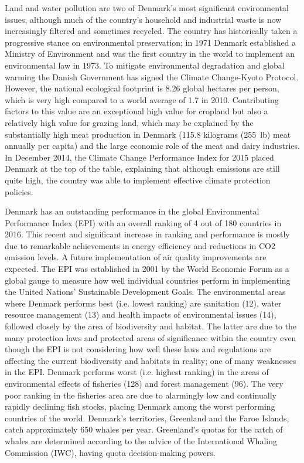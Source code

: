 Land and water pollution are two of Denmark's most significant
environmental issues, although much of the country's household and
industrial waste is now increasingly filtered and sometimes recycled.
The country has historically taken a progressive stance on environmental
preservation; in 1971 Denmark established a Ministry of Environment and
was the first country in the world to implement an environmental law in
1973. To mitigate environmental degradation and global warming the
Danish Government has signed the Climate Change-Kyoto Protocol. However,
the national ecological footprint is 8.26 global hectares per person,
which is very high compared to a world average of 1.7 in 2010.
Contributing factors to this value are an exceptional high value for
cropland but also a relatively high value for grazing land, which may be
explained by the substantially high meat production in Denmark (115.8
kilograms (255~lb) meat annually per capita) and the large economic role
of the meat and dairy industries. In December 2014, the Climate Change
Performance Index for 2015 placed Denmark at the top of the table,
explaining that although emissions are still quite high, the country was
able to implement effective climate protection policies.

Denmark has an outstanding performance in the global Environmental
Performance Index (EPI) with an overall ranking of 4 out of 180
countries in 2016. This recent and significant increase in ranking and
performance is mostly due to remarkable achievements in energy
efficiency and reductions in CO2 emission levels. A future
implementation of air quality improvements are expected. The EPI was
established in 2001 by the World Economic Forum as a global gauge to
measure how well individual countries perform in implementing the United
Nations' Sustainable Development Goals. The environmental areas where
Denmark performs best (i.e. lowest ranking) are sanitation (12), water
resource management (13) and health impacts of environmental issues
(14), followed closely by the area of biodiversity and habitat. The
latter are due to the many protection laws and protected areas of
significance within the country even though the EPI is not considering
how well these laws and regulations are affecting the current
biodiversity and habitats in reality; one of many weaknesses in the EPI.
Denmark performs worst (i.e. highest ranking) in the areas of
environmental effects of fisheries (128) and forest management (96). The
very poor ranking in the fisheries area are due to alarmingly low and
continually rapidly declining fish stocks, placing Denmark among the
worst performing countries of the world. Denmark's territories,
Greenland and the Faroe Islands, catch approximately 650 whales per
year. Greenland's quotas for the catch of whales are determined
according to the advice of the International Whaling Commission (IWC),
having quota decision-making powers.

